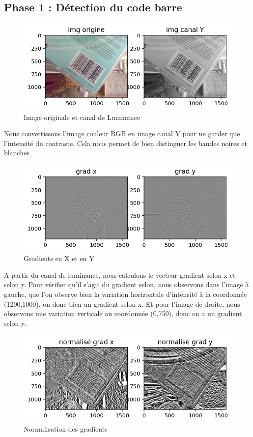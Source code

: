 \documentclass{rapport}
\newcommand{\figsize}{1\textwidth}
\begin{document}
\subsection{Phase 1 : Détection du code barre}

\begin{figure}[H] 
	\centering
	\includegraphics[width=\figsize]{images/Detection/Y.png}
	\caption{Image originale et canal de Luminance}
	\label{Y}
\end{figure}
Nous convertissons l'image couleur RGB en image canal Y pour ne garder que l'intensité du contraste. Cela nous permet de bien distinguer les bandes noires et blanches.
\begin{figure}[H] 
	\centering
	\includegraphics[width=\figsize]{images/Detection/gradients.png}
	\caption{Gradients en X et en Y}
	\label{grad}
\end{figure}
A partir du canal de luminance, nous calculons le vecteur gradient selon x et selon y. Pour vérifier qu'il s'agit du gradient selon, nous observons dans l'image à gauche, que l'on observe bien la variation horizontale d'intensité à la coordonnée (1200,1000), on donc bien un gradient selon x. Et pour l'image de droite, nous observons une variation verticale au coordonnée (0,750), donc on a un gradient selon y.
\begin{figure}[H] 
	\centering
	\includegraphics[width=\figsize]{images/Detection/normalisation.png}
	\caption{Normalisation des gradients}
	\label{norm}
\end{figure}
\end{document}
